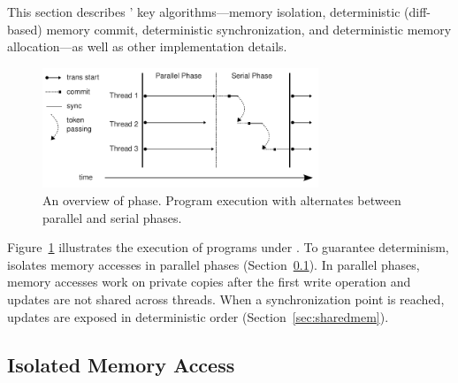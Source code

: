 \label{sec:dthreads-architecture}
This section describes \dthreads{}’ key algorithms—memory isolation, deterministic (diff-based) memory commit, deterministic synchronization, and deterministic memory allocation—as well as other implementation details.

\begin{figure}
{\centering 
\includegraphics[width=3.25in]{dthreads/figure/phase}
\caption{An overview of \dthreads{} phase. Program execution with \dthreads{} alternates between parallel and serial phases.\label{fig:phase}}
}
\end{figure}

Figure~\ref{fig:phase} illustrates the execution of programs under \dthreads{}.  To guarantee determinism, \dthreads{} isolates memory accesses in parallel phases (Section~\ref{sec:threadsasprocs}). 
In parallel phases, memory accesses work on private copies after the first write operation and updates are not shared across threads.  When a synchronization point is reached, updates are exposed in deterministic order (Section~\ref{sec:sharedmem}).
  
\subsection{Isolated Memory Access}
\label{sec:threadsasprocs}

